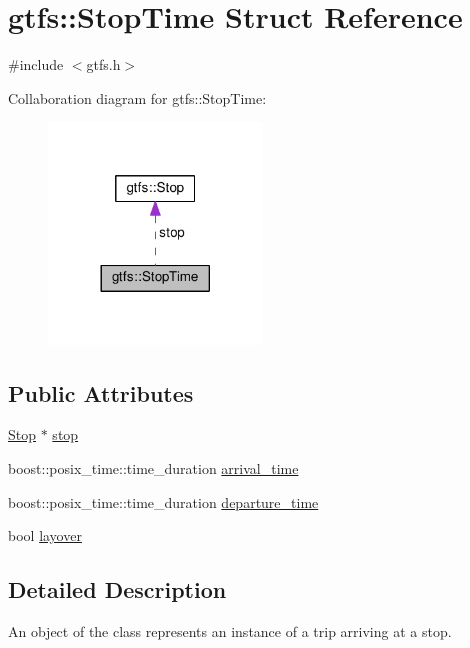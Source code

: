 \hypertarget{structgtfs_1_1StopTime}{}\section{gtfs\+:\+:Stop\+Time Struct Reference}
\label{structgtfs_1_1StopTime}


{\ttfamily \#include $<$gtfs.\+h$>$}



Collaboration diagram for gtfs\+:\+:Stop\+Time\+:\nopagebreak
\begin{figure}[H]
\begin{center}
\leavevmode
\includegraphics[width=161pt]{structgtfs_1_1StopTime__coll__graph}
\end{center}
\end{figure}
\subsection*{Public Attributes}
\begin{DoxyCompactItemize}
\item 
\hyperlink{classgtfs_1_1Stop}{Stop} $\ast$ \hyperlink{structgtfs_1_1StopTime_a258bc40f919b9d804797d7d75f0c0eca}{stop}
\item 
boost\+::posix\+\_\+time\+::time\+\_\+duration \hyperlink{structgtfs_1_1StopTime_a994ec898edd96675200f759acd76a57c}{arrival\+\_\+time}
\item 
boost\+::posix\+\_\+time\+::time\+\_\+duration \hyperlink{structgtfs_1_1StopTime_ad11c398eca36ff99f0934883141de3c9}{departure\+\_\+time}
\item 
bool \hyperlink{structgtfs_1_1StopTime_af8cc780329a837a49a5d6af60b74b9bf}{layover}
\end{DoxyCompactItemize}


\subsection{Detailed Description}
An object of the class represents an instance of a trip arriving at a stop.

